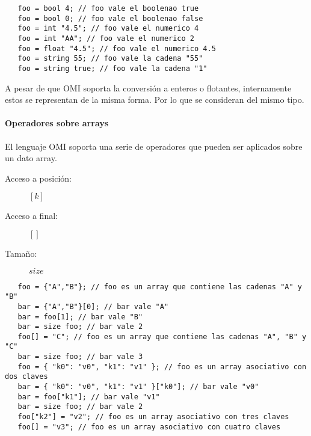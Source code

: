 \begin{lstlisting}
   foo = bool 4; // foo vale el boolenao true
   foo = bool 0; // foo vale el boolenao false
   foo = int "4.5"; // foo vale el numerico 4
   foo = int "AA"; // foo vale el numerico 2
   foo = float "4.5"; // foo vale el numerico 4.5
   foo = string 55; // foo vale la cadena "55" 
   foo = string true; // foo vale la cadena "1" 
\end{lstlisting} 

A pesar de que OMI soporta la conversión a enteros o flotantes, internamente estos se representan de la misma forma. Por lo que
se consideran del mismo tipo.


\paragraph{Operadores sobre arrays} \label{sec:op_array}
El lenguaje OMI soporta una serie de operadores que pueden ser aplicados sobre un dato array.

\begin{description}
\item [Acceso a posición:] $[k]$
\item [Acceso a final:] $[]$
\item [Tamaño:] $size$
\end{description} 

\begin{lstlisting}
   foo = {"A","B"}; // foo es un array que contiene las cadenas "A" y "B"
   bar = {"A","B"}[0]; // bar vale "A"
   bar = foo[1]; // bar vale "B"
   bar = size foo; // bar vale 2
   foo[] = "C"; // foo es un array que contiene las cadenas "A", "B" y "C"
   bar = size foo; // bar vale 3
   foo = { "k0": "v0", "k1": "v1" }; // foo es un array asociativo con dos claves
   bar = { "k0": "v0", "k1": "v1" }["k0"]; // bar vale "v0"
   bar = foo["k1"]; // bar vale "v1"
   bar = size foo; // bar vale 2
   foo["k2"] = "v2"; // foo es un array asociativo con tres claves
   foo[] = "v3"; // foo es un array asociativo con cuatro claves
\end{lstlisting} 

